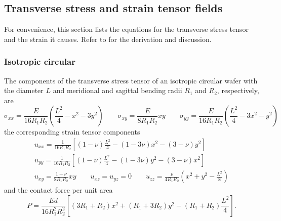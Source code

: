 \documentclass[11pt,a4paper]{article}
\begin{document}
\subsection{Transverse stress and strain tensor fields}
For convenience, this section lists the equations for the transverse stress tensor and the strain it causes. Refer to \cite{honkanen2020} for the derivation and discussion.
\subsubsection{Isotropic circular}
The components of the transverse stress tensor of an isotropic circular wafer with the diameter $L$ and meridional and sagittal bending radii $R_1$ and $R_2$, respectively, are
\begin{equation}
\sigma_{xx} =  \frac{E}{16 R_1 R_2}\left( \frac{L^2}{4} - x^2 - 3 y^2 \right) \qquad
\sigma_{xy} = \frac{E}{8 R_1 R_2}x y \qquad
\sigma_{yy} =  \frac{E}{16 R_1 R_2}\left(\frac{L^2}{4} - 3 x^2 - y^2\right)
\end{equation}
the corresponding strain tensor components
\begin{gather}
u_{xx} = \frac{1}{16 R_1 R_2}\left[(1-\nu)\frac{L^2}{4} - (1-3\nu)x^2 - (3-\nu)y^2 \right] \\
u_{yy} = \frac{1}{16 R_1 R_2}\left[(1-\nu)\frac{L^2}{4} - (1-3\nu)y^2 - (3-\nu)x^2 \right] \\
u_{xy} = \frac{1+\nu}{8 R_1 R_2}x y \qquad u_{xz} = u_{yz} = 0 \qquad
u_{zz} = \frac{\nu}{4 R_1 R_2}\left(x^2 + y^2 -\frac{L^2}{8} \right)
\end{gather}
and the contact force per unit area
\begin{equation}
P = \frac{E d}{16 R_1^2 R_2^2} \left[ 
\left(3 R_1 + R_2 \right) x^2
+ \left(R_1 + 3 R_2 \right) y^2
- \left(R_1 + R_2 \right)\frac{L^2}{4}
\right].
\end{equation}
\end{document}
